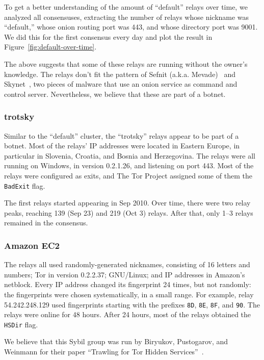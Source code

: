 To get a better understanding of the amount of ``default'' relays over time, we
analyzed all consensuses, extracting the number of relays whose nickname was
``default,'' whose onion routing port was 443, and whose directory port was
9001.  We did this for the first consensus every day and plot the result in
Figure~\ref{fig:default-over-time}.

The above suggests that some of these relays are running without the owner's
knowledge.  The relays don't fit the pattern of Sefnit (a.k.a.
Mevade)~\cite{sefnit} and Skynet~\cite{skynet}, two pieces of malware that use
an onion service as command and control server.  Nevertheless, we believe that
these are part of a botnet.

\subsubsection{trotsky}
\label{sec:trotsky-sybils}
Similar to the ``default'' cluster, the ``trotsky'' relays appear to be part of
a botnet.  Most of the relays' IP addresses were located in Eastern Europe, in
particular in Slovenia, Croatia, and Bosnia and Herzegovina.  The relays were
all running on Windows, in version 0.2.1.26, and listening on port 443.  Most of
the relays were configured as exits, and The Tor Project assigned some of them
the \texttt{BadExit} flag.

The first relays started appearing in Sep 2010.  Over time, there were two relay
peaks, reaching 139 (Sep 23) and 219 (Oct 3) relays.  After that, only 1--3
relays remained in the consensus.


\subsubsection{Amazon EC2}
\label{sec:amazon-sybils}
The relays all used randomly-generated nicknames, consisting of 16 letters and
numbers; Tor in version 0.2.2.37; GNU/Linux; and IP addresses in Amazon's
netblock.  Every IP address changed its fingerprint 24 times, but not randomly:
the fingerprints were chosen systematically, in a small range.  For example,
relay 54.242.248.129 used fingerprints starting with the prefixes \texttt{8D},
\texttt{8E}, \texttt{8F}, and \texttt{90}.  The relays were online for 48 hours.
After 24 hours, most of the relays obtained the \texttt{HSDir} flag.

We believe that this Sybil group was run by Biryukov, Pustogarov, and Weinmann
for their paper ``Trawling for Tor Hidden Services''~\cite{Biryukov2013a}.

